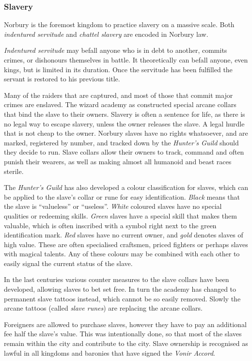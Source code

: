 \subsubsection*{Slavery}

Norbury is the foremost kingdom to practice slavery on a massive scale. Both
\emph{indentured servitude} and \emph{chattel slavery} are encoded in Norbury
law.

\emph{Indentured servitude} may befall anyone who is in debt to another,
commits crimes, or dishonours themselves in battle. It theoretically can
befall anyone, even kings, but is limited in its duration. Once the servitude
has been fulfilled the servant is restored to his previous title.

Many of the raiders that are captured, and most of those that commit major
crimes are enslaved. The wizard academy as constructed special arcane collars
that bind the slave to their owners. Slavery is often a sentence for life, as
there is no legal way to escape slavery, unless the owner releases the slave.
A legal hurdle that is not cheap to the owner. Norbury slaves have no rights
whatsoever, and are marked, registered by number, and tracked down by the
\emph{Hunter's Guild} should they decide to run. Slave collars allow their
owners to track, command and often punish their wearers, as well as making
almost all humanoid and beast races sterile.

The \emph{Hunter's Guild} has also developed a colour classification for
slaves, which can be applied to the slave's collar or rune for easy
identification.  \emph{Black} means that the slave is ``valueless'' or
``useless''. \emph{White} coloured slaves have no special qualities or
redeeming skills. \emph{Green} slaves have a special skill that makes them
valuable, which is often inscribed with a symbol right next to the green
identification mark. \emph{Red} slaves have no current owner, and \emph{gold}
denotes slaves of high value. These are often specialised craftsmen, priced
fighters or perhaps slaves with magical talents. Any of these colours may be
combined with each other to easily signal the current status of the slave.

In the last centuries various counter measures to the slave collars have been
developed, allowing slaves to bet set free. In turn the academy has changed to
permanent slave tattoos instead, which cannot be so easily removed. Slowly the
arcane tattoos (called \emph{slave runes}) are replacing the arcane collars.

Foreigners are allowed to purchase slaves, however they have to pay an
additional fee half the slave's value. This was intentionally done, so that
most of the slaves remain within the city and contribute to the city. Slave
ownership is recognised as lawful in all kingdoms and baronies that have
signed the \emph{Vonir Accord}.

